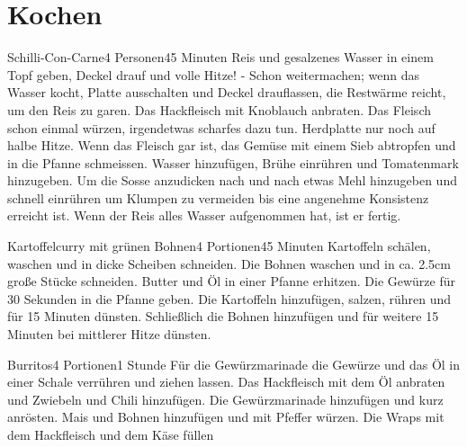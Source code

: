 \documentclass[twoside=true, DIV=16, 11pt,a4paper]{scrreprt}
\begin{document}
	\chapter{Kochen}
	\begin{recipe}{Schilli-Con-Carne}{4 Personen}{45 Minuten}
		Reis und gesalzenes Wasser in einem Topf geben, Deckel drauf und volle Hitze! - Schon weitermachen; wenn das Wasser kocht, Platte ausschalten und Deckel drauflassen, die Restwärme reicht, um den Reis zu garen.
		Das Hackfleisch mit Knoblauch anbraten.
		Das Fleisch schon einmal würzen, irgendetwas scharfes dazu tun. Herdplatte nur noch auf halbe Hitze.
		Wenn das Fleisch gar ist, das Gemüse mit einem Sieb abtropfen und in die Pfanne schmeissen.
		Wasser hinzufügen, Brühe einrühren und Tomatenmark hinzugeben.
		Um die Sosse anzudicken nach und nach etwas Mehl hinzugeben und schnell einrühren um Klumpen zu vermeiden bis eine angenehme Konsistenz erreicht ist.
		\newstep
		Wenn der Reis alles Wasser aufgenommen hat, ist er fertig.
	\end{recipe}
	\clearpage
	\begin{recipe}{Kartoffelcurry mit grünen Bohnen}{4 Portionen}{45 Minuten}
		Kartoffeln schälen, waschen und in dicke Scheiben schneiden. Die Bohnen waschen und in ca. 2.5cm große Stücke schneiden.
		Butter und Öl in einer Pfanne erhitzen.
		Die Gewürze für 30 Sekunden in die Pfanne geben.
		Die Kartoffeln hinzufügen, salzen, rühren und für 15 Minuten dünsten.
		\newstep
		Schließlich die Bohnen hinzufügen und für weitere 15 Minuten bei mittlerer Hitze dünsten.
	\end{recipe}\vfill
	\begin{recipe}{Burritos}{4 Portionen}{1  Stunde}
		Für die Gewürzmarinade die Gewürze und das Öl in einer Schale verrühren und ziehen lassen.
		Das Hackfleisch mit dem Öl anbraten und Zwiebeln und Chili hinzufügen.
		\newstep
		Die Gewürzmarinade hinzufügen und kurz anrösten.
		Mais und Bohnen hinzufügen und mit Pfeffer würzen.
		Die Wraps mit dem Hackfleisch und dem Käse füllen
	\end{recipe}\vfill
\end{document}
